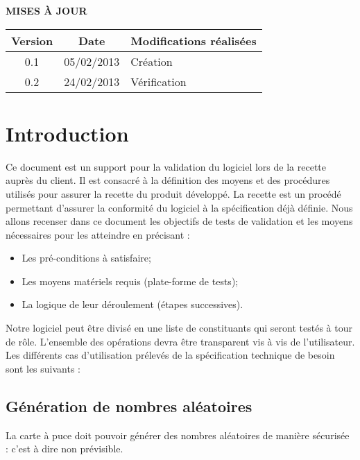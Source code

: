 \documentclass[a4paper,11pt,french]{article}
\begin{document}
\makeFirstPage
\clearpage

\vspace*{1cm}
\begin{center}
\textbf{\huge{MISES À JOUR}}\\
\vspace*{3cm}
\begin{tabularx}{16cm}{|c|c|X|}
\hline
\bfseries{Version} & \bfseries{Date} & \bfseries{Modifications réalisées}\\
\hline
0.1 & 05/02/2013 & Création\\
\hline
0.2 & 24/02/2013 & Vérification\\
\hline
\end{tabularx}
\end{center}

\clearpage
\tableofcontents
\clearpage

\section{Introduction}

Ce document est un support pour la validation du logiciel lors de la recette
auprès du client. Il est consacré à la définition des moyens et des
procédures utilisés pour assurer la recette du produit développé. La recette
est un procédé permettant d’assurer la conformité du logiciel à la
spécification déjà définie. Nous allons recenser dans ce document les
objectifs de tests de validation et les moyens nécessaires pour les atteindre
en précisant :
\begin{itemize}
	\item Les pré-conditions à satisfaire;
	\item Les moyens matériels requis (plate-forme de tests);
	\item La logique de leur déroulement (étapes successives).
\end{itemize}
Notre logiciel peut être divisé en une liste de constituants qui seront
testés à tour de rôle. L'ensemble des opérations devra être transparent
vis à vis de l'utilisateur. Les différents cas d’utilisation prélevés
de la spécification technique de besoin sont les suivants :

\subsection*{Génération de nombres aléatoires}
La carte à puce doit pouvoir générer des nombres aléatoires de manière
sécurisée : c'est à dire non prévisible.
\end{document}
